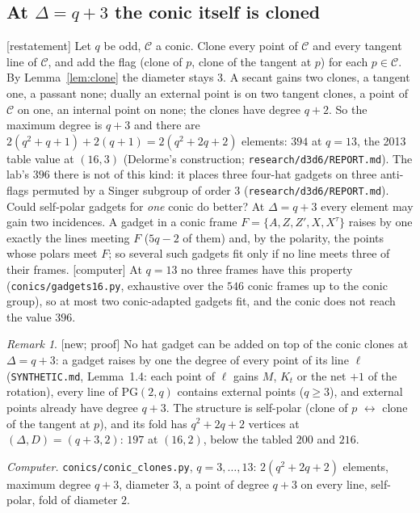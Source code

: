 \documentclass[11pt]{amsart}
\theoremstyle{definition}
\theoremstyle{remark}
\newtheorem{remark}[theorem]{Remark}
\newcommand{\cC}{\mathcal{C}}
\newcommand{\PG}{\mathrm{PG}}
\newcommand{\status}[1]{\textup{[#1]}}
\begin{document}
\subsection{At $\Delta=q+3$ the conic itself is cloned}\label{ssec:delorme}
\status{restatement} Let $q$ be odd, $\cC$ a conic. Clone every point of $\cC$ and every tangent line of $\cC$, and
add the flag (clone of $p$, clone of the tangent at $p$) for each $p\in\cC$. By Lemma~\ref{lem:clone} the diameter
stays $3$. A secant gains two clones, a tangent one, a passant none; dually an external point is on two tangent
clones, a point of $\cC$ on one, an internal point on none; the clones have degree $q+2$. So the maximum degree is
$q+3$ and there are $2(q^2+q+1)+2(q+1)=2(q^2+2q+2)$ elements: $394$ at $q=13$, the 2013 table value at $(16,3)$
(Delorme's construction; \texttt{research/d3d6/REPORT.md}). The lab's $396$ there is not of this kind: it places three
four-hat gadgets on three anti-flags permuted by a Singer subgroup of order $3$ (\texttt{research/d3d6/REPORT.md}).
Could self-polar gadgets for \emph{one} conic do better? At $\Delta=q+3$ every element may gain two incidences. A
gadget in a conic frame $F=\{A,Z,Z',X,X^\tau\}$ raises by one exactly the lines meeting $F$ ($5q-2$ of them) and,
by the polarity, the points whose polars meet $F$; so several such gadgets fit only if no line meets three of their
frames. \status{computer} At $q=13$ no three frames have this property (\texttt{conics/gadgets16.py}, exhaustive over
the $546$ conic frames up to the conic group), so at most two conic-adapted gadgets fit, and the conic does not reach
the value $396$.

\begin{remark}\label{rem:saturated}
\status{new; proof} No hat gadget can be added on top of the conic clones at $\Delta=q+3$: a gadget raises by one the
degree of every point of its line $\ell$ (\texttt{SYNTHETIC.md}, Lemma~1.4: each point of $\ell$ gains $M$, $K_t$ or
the net $+1$ of the rotation), every line of $\PG(2,q)$ contains external points ($q\ge3$), and external points
already have degree $q+3$. The structure is self-polar (clone of $p$ $\leftrightarrow$ clone of the tangent at $p$),
and its fold has $q^2+2q+2$ vertices at $(\Delta,D)=(q+3,2)$: $197$ at $(16,2)$, below the tabled $200$ and $216$.
\end{remark}
\emph{Computer.} \texttt{conics/conic\_clones.py}, $q=3,\dots,13$: $2(q^2+2q+2)$ elements, maximum degree $q+3$,
diameter $3$, a point of degree $q+3$ on every line, self-polar, fold of diameter $2$.
\end{document}
